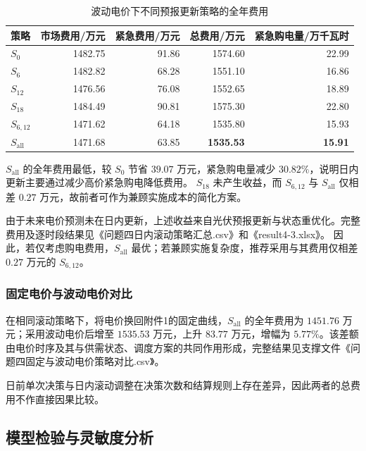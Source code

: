 \begin{table}[H]
    \centering
    \begin{tabular}{lrrrr}
        \toprule
        策略 & 市场费用/万元 & 紧急费用/万元 & 总费用/万元 & 紧急购电量/万千瓦时 \\
        \midrule
        \(S_0\) & 1482.75 & 91.86 & 1574.60 & 22.99 \\
        \(S_6\) & 1482.82 & 68.28 & 1551.10 & 16.86 \\
        \(S_{12}\) & 1476.56 & 76.08 & 1552.65 & 18.89 \\
        \(S_{18}\) & 1484.49 & 90.81 & 1575.30 & 22.80 \\
        \(S_{6,12}\) & 1471.62 & 64.18 & 1535.80 & 15.93 \\
        \(S_{\mathrm{all}}\) & 1471.68 & 63.85 & \textbf{1535.53} & \textbf{15.91} \\
        \bottomrule
    \end{tabular}
    \caption{波动电价下不同预报更新策略的全年费用}
    \label{tab:q4_strategies}
\end{table}

\(S_{\mathrm{all}}\) 的全年费用最低，较 \(S_0\) 节省 \(39.07\) 万元，紧急购电量减少 \(30.82\%\)，说明日内更新主要通过减少高价紧急购电降低费用。
\(S_{18}\) 未产生收益，而 \(S_{6,12}\) 与 \(S_{\mathrm{all}}\) 仅相差 \(0.27\) 万元，故前者可作为兼顾实施成本的简化方案。

由于未来电价预测未在日内更新，上述收益来自光伏预报更新与状态重优化。完整费用及逐时段结果见《问题四日内滚动策略汇总.csv》和《result4-3.xlsx》。
因此，若仅考虑购电费用，\(S_{\mathrm{all}}\) 最优；若兼顾实施复杂度，推荐采用与其费用仅相差 \(0.27\) 万元的 \(S_{6,12}\)。

\subsubsection{固定电价与波动电价对比}
在相同滚动策略下，将电价换回附件1的固定曲线，\(S_{\mathrm{all}}\) 的全年费用为 \(1451.76\) 万元；采用波动电价后增至 \(1535.53\) 万元，上升 \(83.77\) 万元，增幅为 \(5.77\%\)。该差额由电价时序及其与供需状态、调度方案的共同作用形成，完整结果见支撑文件《问题四固定与波动电价策略对比.csv》。

日前单次决策与日内滚动调整在决策次数和结算规则上存在差异，因此两者的总费用不作直接因果比较。

\subsection{模型检验与灵敏度分析}

